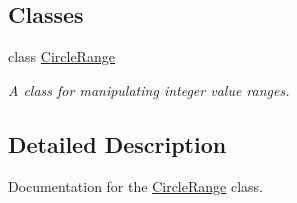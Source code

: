 \subsection*{Classes}
\begin{DoxyCompactItemize}
\item 
class \mbox{\hyperlink{class_circle_range}{Circle\+Range}}
\begin{DoxyCompactList}\small\item\em A class for manipulating integer value ranges. \end{DoxyCompactList}\end{DoxyCompactItemize}


\subsection{Detailed Description}
Documentation for the \mbox{\hyperlink{class_circle_range}{Circle\+Range}} class. 

